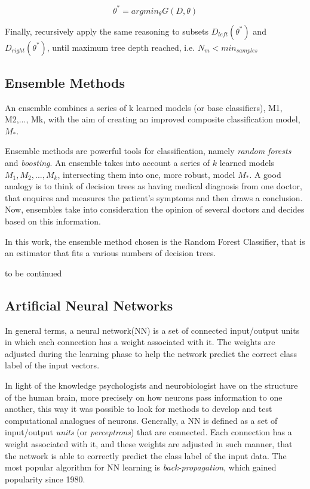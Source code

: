 \begin{equation}
\theta^* = argmin_{\theta}  G(D, \theta)
\end{equation} 

Finally, recursively apply the same reasoning to subsets $D_{left}(\theta^*)$ and $D_{right}(\theta^*)$, until maximum tree depth reached, i.e. $N_m < min_{samples}$ \cite{DTform}

\subsection{Ensemble Methods}

An ensemble combines a series of k learned models (or base classifiers), M1, M2,..., Mk, with the aim of creating an improved composite classification model, $M_{*}$.  

Ensemble methods are powerful tools for classification, namely \textit{random forests} and \textit{boosting}. An ensemble takes into account a series of $k$ learned models $M_1, M_2,...,M_k$, intersecting them into one,  more robust, model $M_*$. A good analogy is to think of decision trees as having medical diagnosis from one doctor, that enquires and measures the patient's symptoms and then draws a conclusion. Now, ensembles take into consideration the opinion of several doctors and decides based on this information. 

In this work, the ensemble method chosen is the Random Forest Classifier, that is an estimator that fits a various numbers of decision trees. \cite{HanDataMining}

to be continued

\subsection{Artificial Neural Networks}

In general terms, a neural network(NN) is a set of connected input/output units in which each connection has a weight associated with it. The weights are adjusted during the learning phase to help the network predict the correct class label of the input vectors.

In light of the knowledge psychologists and neurobiologist have on the structure of the human brain, more precisely on how neurons pass information to one another, this way it was possible to look for methods to develop and test computational analogues of neurons. Generally, a NN is defined as a set of input/output \textit{units} (or \textit{perceptrons}) that are connected. Each connection has a weight associated with it, and these weights are adjusted in such manner, that the network is able to correctly predict the class label of the input data. The most popular algorithm for NN learning is \textit{back-propagation}, which gained popularity since 1980. \cite{HanDataMining}

